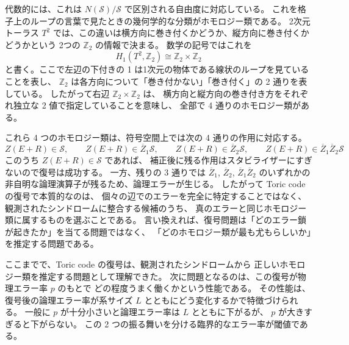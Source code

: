 \documentclass[../master.tex]{subfiles}
\begin{document}
代数的には、これは \(N(\mathcal S)/\mathcal S\) で区別される自由度に対応している。
これを格子上のループの言葉で見たときの幾何学的な分類がホモロジー類である。
2次元トーラス \(T^2\) では、この違いは横方向に巻き付くかどうか、縦方向に巻き付くかどうかという
2つの \(\mathbb Z_2\) の情報で決まる。
数学の記号ではこれを
\begin{equation}
    H_1(T^2,\mathbb Z_2)\cong \mathbb Z_2\times \mathbb Z_2
\end{equation}
と書く。ここで左辺の下付きの 1 は1次元の物体である線状のループを見ていることを表し、
\(\mathbb Z_2\) は各方向について「巻き付かない」「巻き付く」の 2 通りを表している。
したがって右辺 \(\mathbb Z_2\times \mathbb Z_2\) は、
横方向と縦方向の巻き付き方をそれぞれ独立な 2 値で指定していることを意味し、
全部で 4 通りのホモロジー類がある。

これら 4 つのホモロジー類は、符号空間上では次の 4 通りの作用に対応する。
\begin{equation}
    Z(E+R)\in \mathcal S,\qquad
    Z(E+R)\in \overline{Z}_1\mathcal S,\qquad
    Z(E+R)\in \overline{Z}_2\mathcal S,\qquad
    Z(E+R)\in \overline{Z}_1\overline{Z}_2\mathcal S
\end{equation}
このうち \(Z(E+R)\in\mathcal S\) であれば、
補正後に残る作用はスタビライザーにすぎないので復号は成功する。
一方、残りの 3 通りでは
\(\overline{Z}_1\), \(\overline{Z}_2\), \(\overline{Z}_1\overline{Z}_2\)
のいずれかの非自明な論理演算子が残るため、論理エラーが生じる。
したがって Toric code の復号で本質的なのは、
個々の辺でのエラーを完全に特定することではなく、
観測されたシンドロームに整合する候補のうち、
真のエラーと同じホモロジー類に属するものを選ぶことである。
言い換えれば、復号問題は「どのエラー鎖が起きたか」を当てる問題ではなく、
「どのホモロジー類が最も尤もらしいか」を推定する問題である。

ここまでで、Toric code の復号は、観測されたシンドロームから
正しいホモロジー類を推定する問題として理解できた。
次に問題となるのは、この復号が物理エラー率 \(p\) のもとで
どの程度うまく働くかという性能である。
その性能は、復号後の論理エラー率が系サイズ \(L\) とともにどう変化するかで特徴づけられる。
一般に \(p\) が十分小さいと論理エラー率は \(L\) とともに下がるが、
\(p\) が大きすぎると下がらない。
この 2 つの振る舞いを分ける臨界的なエラー率が閾値である。
\end{document}
